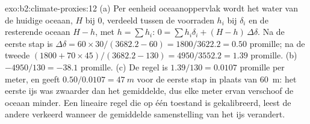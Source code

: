 \begin{solution}{exo:b2:climate-proxies:12}
(a) Per eenheid oceaanoppervlak wordt het water van de huidige oceaan, $H$ bij 0, verdeeld tussen de voorraden
$h_i$ bij $\delta_i$ en de resterende oceaan $H - h$, met $h = \sum h_i$: $0 = \sum h_i\delta_i +
(H - h)\,\Delta\delta$. Na de eerste stap is $\Delta\delta = 60 \times 30/(3682.2 - 60) =
1800/3622.2 = 0.50$ promille; na de tweede $(1800 + 70 \times 45)/(3682.2 - 130) =
4950/3552.2 = 1.39$ promille. (b) $-4950/130 = -38.1$ promille. (c) De regel is $1.39/130 = 0.0107$
promille per meter, en geeft $0.50/0.0107 = \qty{47}{m}$ voor de eerste stap in plaats van
\qty{60}{m}: het eerste ijs was zwaarder dan het gemiddelde, dus elke meter ervan verschoof de oceaan
minder. Een lineaire regel die op één toestand is gekalibreerd, leest de andere verkeerd wanneer de gemiddelde samenstelling van het
ijs verandert.
\end{solution}

